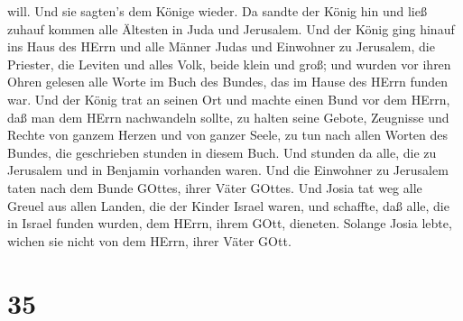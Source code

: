 will. Und sie sagten's dem Könige wieder.  Da sandte der
König hin und ließ zuhauf kommen alle Ältesten in Juda und Jerusalem.
 Und der König ging hinauf ins Haus des HErrn und alle
Männer Judas und Einwohner zu Jerusalem, die Priester, die Leviten und
alles Volk, beide klein und groß; und wurden vor ihren Ohren gelesen
alle Worte im Buch des Bundes, das im Hause des HErrn funden war.
 Und der König trat an seinen Ort und machte einen Bund vor
dem HErrn, daß man dem HErrn nachwandeln sollte, zu halten seine Gebote,
Zeugnisse und Rechte von ganzem Herzen und von ganzer Seele, zu tun nach
allen Worten des Bundes, die geschrieben stunden in diesem Buch.
 Und stunden da alle, die zu Jerusalem und in Benjamin
vorhanden waren. Und die Einwohner zu Jerusalem taten nach dem Bunde
GOttes, ihrer Väter GOttes.  Und Josia tat weg alle Greuel
aus allen Landen, die der Kinder Israel waren, und schaffte, daß alle,
die in Israel funden wurden, dem HErrn, ihrem GOtt, dieneten. Solange
Josia lebte, wichen sie nicht von dem HErrn, ihrer Väter GOtt.

\hypertarget{section-34}{%
\section{35}\label{section-34}}

